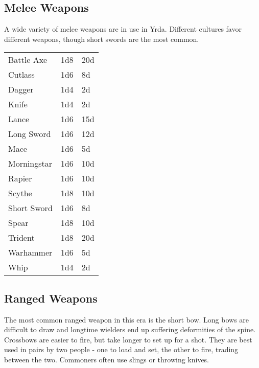 \subsection{Melee Weapons}

A wide variety of melee weapons are in use in Yrda. Different
cultures favor different weapons, though short swords are the
most common.

\begin{center}
{
\begin{xtabular}{|l|l|l|}
Battle Axe & 1d8 & 20d \\
Cutlass & 1d6 & 8d \\
Dagger & 1d4 & 2d \\
Knife & 1d4 & 2d \\
Lance & 1d6 & 15d \\
Long Sword & 1d6 & 12d \\
Mace & 1d6 & 5d \\
Morningstar & 1d6 & 10d \\
Rapier & 1d6 & 10d \\
Scythe & 1d8 & 10d \\
Short Sword & 1d6 & 8d \\
Spear & 1d8 & 10d \\
Trident & 1d8 & 20d \\
Warhammer & 1d6 & 5d \\
Whip & 1d4 & 2d \\
\hline
\end{xtabular}
}
\end{center}

\subsection{Ranged Weapons}

The most common ranged weapon in this era is the short bow. Long bows
are difficult to draw and longtime wielders end up suffering deformities
of the spine. Crossbows are easier to fire, but take longer to set up for
a shot. They are best used in pairs by two people - one to load and set,
the other to fire, trading between the two. Commoners often use slings or
throwing knives.

